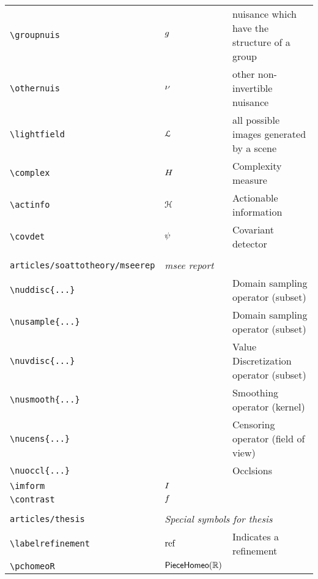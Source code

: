 \begin{longtable}{lll}
 {\color[rgb]{0.5,0.5,0.5}\texttt{\textbackslash groupnuis}} & $g$ &  nuisance which have the structure of a group\\ 
 {\color[rgb]{0.5,0.5,0.5}\texttt{\textbackslash othernuis}} & $\nu$ &  other non-invertible nuisance\\ 
 {\color[rgb]{0.5,0.5,0.5}\texttt{\textbackslash lightfield}} & $\mathcal{L}$ &  all possible images generated by a scene\\ 
 {\color[rgb]{0.5,0.5,0.5}\texttt{\textbackslash complex}} & $H$ &  Complexity measure\\ 
 {\color[rgb]{0.5,0.5,0.5}\texttt{\textbackslash actinfo}} & $\mathcal{H}$ &  Actionable information\\ 
 {\color[rgb]{0.5,0.5,0.5}\texttt{\textbackslash covdet}} & $\psi$ &  Covariant detector\\ 
  &  & \\ 
 {\color[rgb]{0.5,0.5,0.5}\texttt{articles/soattotheory/mseerep}} & \multicolumn{2}{l}{\emph{msee report}}\\ 
 \hline
{\color[rgb]{0.5,0.5,0.5}\texttt{\textbackslash nuddisc\{...\}}} &  &  Domain sampling operator (subset)\\ 
 {\color[rgb]{0.5,0.5,0.5}\texttt{\textbackslash nusample\{...\}}} &  &  Domain sampling operator (subset)\\ 
 {\color[rgb]{0.5,0.5,0.5}\texttt{\textbackslash nuvdisc\{...\}}} &  &  Value Discretization operator (subset)\\ 
 {\color[rgb]{0.5,0.5,0.5}\texttt{\textbackslash nusmooth\{...\}}} &  &  Smoothing operator (kernel)\\ 
 {\color[rgb]{0.5,0.5,0.5}\texttt{\textbackslash nucens\{...\}}} &  &  Censoring operator (field of view)\\ 
 {\color[rgb]{0.5,0.5,0.5}\texttt{\textbackslash nuoccl\{...\}}} &  &  Occlsions\\ 
 {\color[rgb]{0.5,0.5,0.5}\texttt{\textbackslash imform}} & $I$ & \\ 
 {\color[rgb]{0.5,0.5,0.5}\texttt{\textbackslash contrast}} & $f$ & \\ 
  &  & \\ 
 {\color[rgb]{0.5,0.5,0.5}\texttt{articles/thesis}} & \multicolumn{2}{l}{\emph{Special symbols for thesis}}\\ 
 \hline
{\color[rgb]{0.5,0.5,0.5}\texttt{\textbackslash labelrefinement}} & $\text{ref}$ &  Indicates a refinement\\ 
 {\color[rgb]{0.5,0.5,0.5}\texttt{\textbackslash pchomeoR}} & $\mathsf{PieceHomeo}(\mathbb{R})$ & \\ 

\end{longtable}
